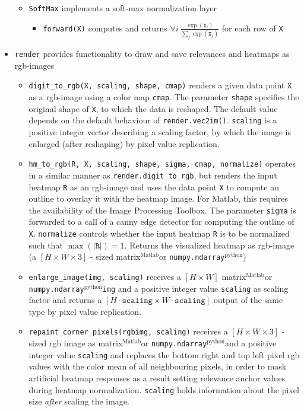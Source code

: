 \documentclass[a4wide]{article}
\newcommand{\mat}{$^\text{Matlab}$}
\newcommand{\py}{$^\text{python}$}
\begin{document}
\begin{itemize}
\begin{itemize}
		\item \texttt{SoftMax} implements a soft-max normalization layer
			\begin{itemize}
				\item \texttt{forward(X)} computes and returns $\forall i ~ \frac{\exp(\texttt{X}_i)}{\sum_j \exp(\texttt{X}_j)}$ for each row of \texttt{X}
			\end{itemize}		
	\end{itemize}
\item \texttt{render} provides functionality to draw and save relevances and heatmaps as rgb-images
	\begin{itemize}
		\item \texttt{digit\_to\_rgb(X, scaling, shape, cmap)} renders a given data point \texttt{X} as a rgb-image using a color map \texttt{cmap}. The parameter \texttt{shape} specifies the original shape of \texttt{X}, to which the data is reshaped. The default value depends on the default behaviour of \texttt{render.vec2im()}. \texttt{scaling} is a positive integer vector describing a scaling factor, by which the image is enlarged (after reshaping) by pixel value replication.
		\item \texttt{hm\_to\_rgb(R, X, scaling, shape, sigma, cmap, normalize)} operates in a similar manner as \texttt{render.digit\_to\_rgb}, but renders the input heatmap \texttt{R} as an rgb-image and uses the data point \texttt{X} to compute an outline to overlay it with the heatmap image. For Matlab, this requires the availability of the Image Processing Toolbox. The parameter \texttt{sigma} is forwarded to a call of a canny edge detector for computing the outline of \texttt{X}. \texttt{normalize} controls whether the input heatmap \texttt{R} is to be normalized such that $\max(|\texttt{R}|) = 1$. Returns the visualized heatmap as rgb-image (a $[H \times W \times 3]$ - sized matrix\mat or \texttt{numpy.ndarray}\py)
		\item \texttt{enlarge\_image(img, scaling)} receives a $[H \times W]$ matrix\mat or \texttt{numpy.ndarray}\py \texttt{img} and a positive integer value \texttt{scaling} as scaling factor and returns a $[H\cdot\texttt{scaling} \times W\cdot\texttt{scaling}]$ output of the same type by pixel value replication.
		\item \texttt{repaint\_corner\_pixels(rgbimg, scaling)} receives a $[H \times W \times 3]$ - sized rgb image as matrix\mat or \texttt{numpy.ndarray}\py and a positive integer value \texttt{scaling} and replaces the bottom right and top left pixel rgb values with the color mean of all neighbouring pixels, in order to mask artificial heatmap responses as a result setting relevance anchor values during heatmap normalization. \texttt{scaling} holds information about the pixel size \emph{after} scaling the image. 

\end{itemize}
\end{itemize}
\end{document}
